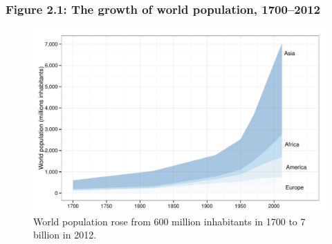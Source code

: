 \documentclass[t]{beamer}\usepackage[]{graphicx}\usepackage[]{color}
\newenvironment{knitrout}{}{} %
\begin{document}
\begin{frame}[label=Figure_2_1]
\frametitle{Figure 2.1: The growth of world population, 1700--2012}
\begin{figure}[t]
\begin{minipage}[b]{\textwidth}
\centering
\begin{knitrout}\footnotesize
{}\color{fgcolor}

{\centering \includegraphics[width=1\linewidth]{figures/color/Figure_2_1} 

}



\end{knitrout}
\caption{World population rose from 600 million inhabitants in 1700 to 7 billion in 2012.}
\end{minipage}
\end{figure}
\end{frame}
\end{document}
